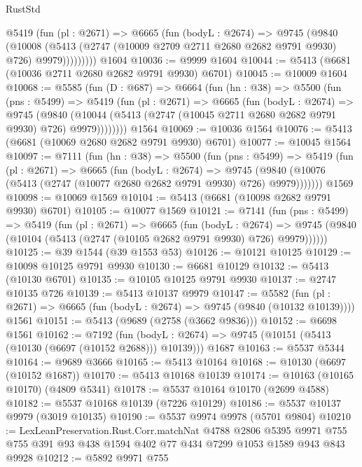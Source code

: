 \begin{lexlean}{RustStd}
\begin{coremodule}
          @5419
            (fun (pl : @2671) =>
            @6665
              (fun (bodyL : @2674) =>
              @9745
                (@9840
                  (@10008
                    (@5413 (@2747 (@10009 @2709 @2711 @2680 @2682 @9791 @9930) @726) @9979)))))))))
    @1604
@10036 := @9999 @1604
@10044 := @5413 (@6681 (@10036 @2711 @2680 @2682 @9791 @9930) @6701)
@10045 := @10009 @1604
@10068 := @5585
    (fun (D : @687) =>
    @6664
      (fun (hn : @38) =>
      @5500
        (fun (pns : @5499) =>
        @5419
          (fun (pl : @2671) =>
          @6665
            (fun (bodyL : @2674) =>
            @9745
              (@9840
                (@10044 (@5413 (@2747 (@10045 @2711 @2680 @2682 @9791 @9930) @726) @9979))))))))
    @1564
@10069 := @10036 @1564
@10076 := @5413 (@6681 (@10069 @2680 @2682 @9791 @9930) @6701)
@10077 := @10045 @1564
@10097 := @7111
    (fun (hn : @38) =>
    @5500
      (fun (pns : @5499) =>
      @5419
        (fun (pl : @2671) =>
        @6665
          (fun (bodyL : @2674) =>
          @9745 (@9840 (@10076 (@5413 (@2747 (@10077 @2680 @2682 @9791 @9930) @726) @9979)))))))
    @1569
@10098 := @10069 @1569
@10104 := @5413 (@6681 (@10098 @2682 @9791 @9930) @6701)
@10105 := @10077 @1569
@10121 := @7141
    (fun (pns : @5499) =>
    @5419
      (fun (pl : @2671) =>
      @6665
        (fun (bodyL : @2674) =>
        @9745 (@9840 (@10104 (@5413 (@2747 (@10105 @2682 @9791 @9930) @726) @9979))))))
@10125 := @39 @1544 (@39 @1553 @53)
@10126 := @10121 @10125
@10129 := @10098 @10125 @9791 @9930
@10130 := @6681 @10129
@10132 := @5413 (@10130 @6701)
@10135 := @10105 @10125 @9791 @9930
@10137 := @2747 @10135 @726
@10139 := @5413 @10137 @9979
@10147 := @5582
    (fun (pl : @2671) => @6665 (fun (bodyL : @2674) => @9745 (@9840 (@10132 @10139))))
    @1561
@10151 := @5413 (@9689 (@2758 (@3662 @9836)))
@10152 := @6698 @1561
@10162 := @7192
    (fun (bodyL : @2674) => @9745 (@10151 (@5413 (@10130 (@6697 (@10152 @2688))) @10139)))
    @1687
@10163 := @5537 @5344
@10164 := @9689 @3666
@10165 := @5413 @10164
@10168 := @10130 (@6697 (@10152 @1687))
@10170 := @5413 @10168 @10139
@10174 := @10163 (@10165 @10170) (@4809 @5341)
@10178 := @5537 @10164 @10170 (@2699 @4588)
@10182 := @5537 @10168 @10139 (@7226 @10129)
@10186 := @5537 @10137 @9979 (@3019 @10135)
@10190 := @5537 @9974 @9978 (@5701 @9804)
@10210 := LexLeanPreservation.Rust.Corr.matchNat
    @4788
    @2806
    @5395
    @9971
    @755
    @755
    @391
    @93
    @438
    @1594
    @402
    @77
    @434
    @7299
    @1053
    @1589
    @943
    @843
    @9928
@10212 := @5892 @9971 @755

\end{coremodule}
\end{lexlean}
